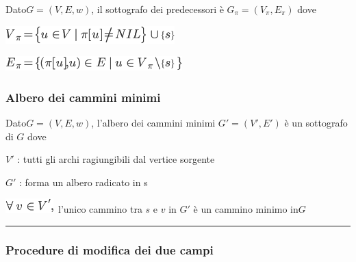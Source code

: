 \documentclass{article}
\begin{document}
{Dato}$G=(V,E,w)${, il sottografo dei predecessori è $G_\pi=(V_\pi,E_\pi)$ dove}

\includegraphics{images/image512.png}{~}

\includegraphics{images/image513.png}{~}

\subsubsection{\texorpdfstring{{Albero dei cammini minimi}}{Albero dei cammini minimi}}\label{h.2lffyamho46s}

{Dato}$G=(V,E,w)${, l'albero dei cammini minimi $G'=(V',E')$ è un sottografo di $G$ dove}

{$V'$ : tutti gli archi ragiungibili dal vertice sorgente}

{$G'$ : forma un albero radicato in s}

\includegraphics{images/image516.png}{~l'unico cammino tra $s$ e $v$ in $G'$ è un cammino minimo in}$G$

\begin{center}\rule{0.5\linewidth}{\linethickness}\end{center}

\subsubsection{\texorpdfstring{{}}{}}\label{h.h4dk3zmkq25w}

\subsubsection{\texorpdfstring{{Procedure di modifica dei due
campi}}{Procedure di modifica dei due campi}}\label{h.5lg4kz3z4f5y}

\protect\hypertarget{t.29f77ac6905498186484b14fa7bf14ea64fecb79}{}{}\protect\hypertarget{t.46}{}{}




\protect\hypertarget{t.4fa4368bfb7c1d485140ed33f86edf6c298bfda0}{}{}\protect\hypertarget{t.47}{}{}
\end{document}
